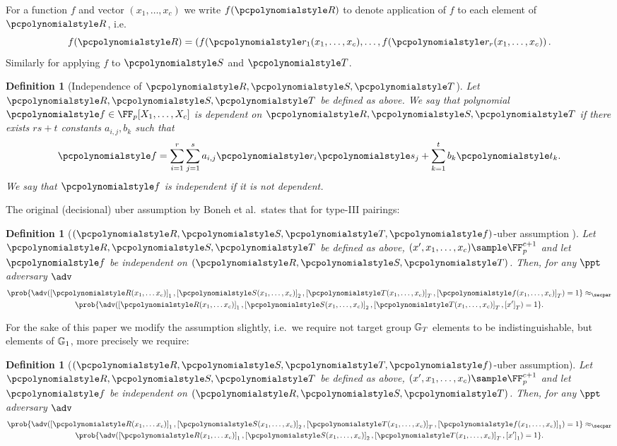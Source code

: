 \let\accentvec\vec \documentclass[runningheads,10pt]{llncs}
\newtheorem{definition}[theorem]{Definition}
\begin{document}
For a function $f$ and vector $(x_1, \ldots, x_c)$ we write $f(\pR)$ to
denote application of $f$ to each element of $\pR$, i.e.
\[
	f(\pR) = \left( f(\p{r}_1 (x_1, \ldots, x_c), \ldots, f(\p{r}_r
	(x_1, \ldots, x_c) \right).
\]
Similarly for applying $f$ to $\pS$ and $\pT$.

\begin{definition}[Independence of $\pR, \pS, \pT$]
	\label{def:independence}
	Let $\pR, \pS, \pT$ be defined as above. We say that polynomial
	$\p{f} \in \FF_p[X_1, \ldots, X_c]$ is \emph{dependent} on $\pR, \pS,
	\pT$ if there exists $rs + t$ constants $a_{i, j}, b_k$ such that 
	\[
		\p{f} = \sum_{i = 1}^{r} \sum_{j = 1}^{s} a_{i, j} \p{r}_i \p{s}_j +
		\sum_{k = 1}^{t} b_k \p{t}_k.
	\]
	We say that $\p{f}$ is \emph{independent} if it is not dependent.
\end{definition}

The original (decisional) uber assumption by Boneh et al.~states that for
type-III pairings:

\begin{definition}[$(\pR, \pS, \pT, \p{f})$-uber assumption
	\cite{EC:BonBoyGoh05}]
	\label{def:uber_assumption_orig}
	Let $\pR, \pS, \pT$ be defined as above, $(x', x_1, \ldots, x_c) \sample \FF_p^{c + 1}$ and let
	$\p{f}$ be independent on $(\pR, \pS, \pT)$.
	Then, for any $\ppt$ adversary $\adv$
	\begin{multline*}
		\prob{\adv(\gone{\pR(x_1, \ldots x_c)}, \gtwo{\pS(x_1, \ldots, x_c)},
		\gtar{\pT(x_1, \ldots, x_c)}, \gtar{\p{f}(x_1, \ldots, x_c)}) = 1} \approx_\secpar \\ 
		\prob{\adv(\gone{\pR(x_1, \ldots x_c)}, \gtwo{\pS(x_1, \ldots, x_c)},
		\gtar{\pT(x_1, \ldots, x_c)}, \gtar{x'}) = 1}.  
	\end{multline*}
\end{definition}

For the sake of this paper we modify the assumption slightly, i.e.~we require
not target group $\mathbb{G}_T$ elements to be indistinguishable, but elements of
$\mathbb{G}_1$, more precisely we require: 

\begin{definition}[$(\pR, \pS, \pT, \p{f})$-uber assumption]
	\label{def:uber_assumption}
	Let $\pR, \pS, \pT$ be defined as above, $(x', x_1, \ldots, x_c) \sample \FF_p^{c + 1}$ and let
	$\p{f}$ be independent on $(\pR, \pS, \pT)$.
	Then, for any $\ppt$ adversary $\adv$
	\begin{multline*}
		\prob{\adv(\gone{\pR(x_1, \ldots x_c)}, \gtwo{\pS(x_1, \ldots, x_c)},
		\gtar{\pT(x_1, \ldots, x_c)}, \gone{\p{f}(x_1, \ldots, x_c)}) = 1} \approx_\secpar \\ 
		\prob{\adv(\gone{\pR(x_1, \ldots x_c)}, \gtwo{\pS(x_1, \ldots, x_c)},
		\gtar{\pT(x_1, \ldots, x_c)}, \gone{x'}) = 1}.  
	\end{multline*}
\end{definition}
\end{document}
